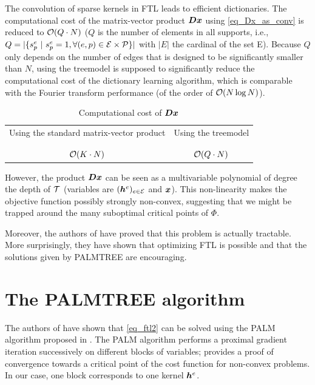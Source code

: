 The convolution of sparse kernels in \ac{FTL} leads to efficient dictionaries. The computational cost of the matrix-vector product $\bm{D}\bm{x}$ using \cref{eq_Dx_as_conv} is reduced to $\mathcal{O}(Q \cdot N)$ ($Q$ is the number of elements in all supports, i.e., $Q=|\{s^e_p ~|~ s^e_p = 1, \forall (e,p) \in \mathcal E \times \mathcal P\}|$ with $|E|$ the cardinal of the set E). Because $Q$ only depends on the number of edges that is designed to be significantly smaller than  $N$, using the \gls{treemodel} is supposed to significantly reduce the computational cost of the dictionary learning algorithm, which is comparable with the Fourier transform performance (of the order of $\mathcal{O}(N \log N)$).

\begin{table}[!ht] \centering 
\caption{Computational cost of $\bm{D}\bm{x}$}\label{table_comparison_Dx_costs}
\begin{tabular}{c|c}
Using the standard matrix-vector product & Using the \gls{treemodel} \\\\ \hline \\
$\mathcal{O}(K \cdot N)$ & $\mathcal{O}(Q \cdot N)$
\end{tabular}
\end{table}


\noindent
However, the product $\bm{D}\bm{x}$ can be seen as a multivariable polynomial of degree the depth of $\mathcal T$ (variables are $(\bm{h}^e)_{e \in \mathcal E}$ and $\bm{x}$). This non-linearity makes the objective function possibly strongly non-convex, suggesting that we might be trapped around the many suboptimal critical points of $\Phi$.

\noindent
Moreover, the authors of \cite{chabiron_optimization_2016} have proved that this problem is actually tractable. More surprisingly, they have shown that optimizing \ac{FTL} is possible and that the solutions given by \acs{PALMTREE} are encouraging.


\section{The PALMTREE algorithm}\label{sec_palmtree}

The authors of \cite{chabiron_optimization_2016} have shown that \eqref{eq_ftl2} can be solved using the \ac{PALM} algorithm proposed in \cite{bolte_proximal_2014}. The \ac{PALM} algorithm performs a proximal gradient iteration successively on different blocks of variables; \cite{bolte_proximal_2014} provides a proof of convergence towards a critical point of the cost function for non-convex problems. In our case, one block corresponds to one kernel $\bm{h}^e$.

